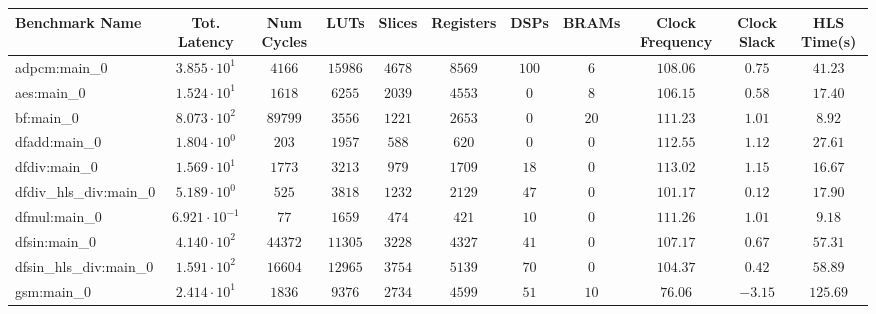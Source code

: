 \begin{tabular}{|l|c|c|c|c|c|c|c|c|c|c|}
\hline
Benchmark Name          & Tot. Latency            & Num Cycles & LUTs      & Slices    & Registers & DSPs    & BRAMs   & Clock Frequency & Clock Slack & HLS Time(s) \\
\hline
adpcm:main\_0           & $ 3.855 \cdot 10^{1}  $ & $ 4166   $ & $ 15986 $ & $ 4678  $ & $ 8569  $ & $ 100 $ & $ 6   $ & $ 108.06      $ & $ 0.75    $ & $ 41.23   $ \\
aes:main\_0             & $ 1.524 \cdot 10^{1}  $ & $ 1618   $ & $ 6255  $ & $ 2039  $ & $ 4553  $ & $ 0   $ & $ 8   $ & $ 106.15      $ & $ 0.58    $ & $ 17.40   $ \\
bf:main\_0              & $ 8.073 \cdot 10^{2}  $ & $ 89799  $ & $ 3556  $ & $ 1221  $ & $ 2653  $ & $ 0   $ & $ 20  $ & $ 111.23      $ & $ 1.01    $ & $ 8.92    $ \\
dfadd:main\_0           & $ 1.804 \cdot 10^{0}  $ & $ 203    $ & $ 1957  $ & $ 588   $ & $ 620   $ & $ 0   $ & $ 0   $ & $ 112.55      $ & $ 1.12    $ & $ 27.61   $ \\
dfdiv:main\_0           & $ 1.569 \cdot 10^{1}  $ & $ 1773   $ & $ 3213  $ & $ 979   $ & $ 1709  $ & $ 18  $ & $ 0   $ & $ 113.02      $ & $ 1.15    $ & $ 16.67   $ \\
dfdiv\_hls\_div:main\_0 & $ 5.189 \cdot 10^{0}  $ & $ 525    $ & $ 3818  $ & $ 1232  $ & $ 2129  $ & $ 47  $ & $ 0   $ & $ 101.17      $ & $ 0.12    $ & $ 17.90   $ \\
dfmul:main\_0           & $ 6.921 \cdot 10^{-1} $ & $ 77     $ & $ 1659  $ & $ 474   $ & $ 421   $ & $ 10  $ & $ 0   $ & $ 111.26      $ & $ 1.01    $ & $ 9.18    $ \\
dfsin:main\_0           & $ 4.140 \cdot 10^{2}  $ & $ 44372  $ & $ 11305 $ & $ 3228  $ & $ 4327  $ & $ 41  $ & $ 0   $ & $ 107.17      $ & $ 0.67    $ & $ 57.31   $ \\
dfsin\_hls\_div:main\_0 & $ 1.591 \cdot 10^{2}  $ & $ 16604  $ & $ 12965 $ & $ 3754  $ & $ 5139  $ & $ 70  $ & $ 0   $ & $ 104.37      $ & $ 0.42    $ & $ 58.89   $ \\
gsm:main\_0             & $ 2.414 \cdot 10^{1}  $ & $ 1836   $ & $ 9376  $ & $ 2734  $ & $ 4599  $ & $ 51  $ & $ 10  $ & $ 76.06       $ & $ -3.15   $ & $ 125.69  $ \\

\end{tabular}
